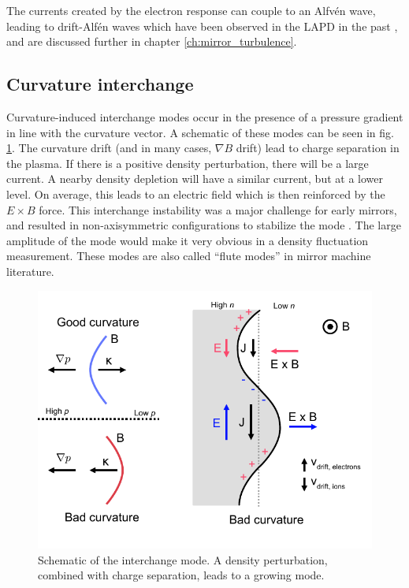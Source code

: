 The currents created by the electron response can couple to an Alfv\'en wave, leading to drift-Alf\'en waves which have been observed in the LAPD in the past \cite{Maggs_1997, Vincena_2006}, and are discussed further in chapter \ref{ch:mirror_turbulence}.

\subsection{Curvature interchange}

Curvature-induced interchange modes occur in the presence of a pressure gradient in line with the curvature vector. A schematic of these modes can be seen in fig. \ref{fig:interchange}. The curvature drift (and in many cases, $\nabla B$ drift) lead to charge separation in the plasma. If there is a positive density perturbation, there will be a large current. A nearby density depletion will have a similar current, but at a lower level. On average, this leads to an electric field which is then reinforced by the $E \times B$ force. This interchange instability was a major challenge for early mirrors, and resulted in non-axisymmetric configurations to stabilize the mode \cite{Post_1987}. The large amplitude of the mode would make it very obvious in a density fluctuation measurement. These modes are also called ``flute modes'' in mirror machine literature.

\begin{figure}
	\centering
	\includegraphics[width=400pt]{figures/interchange.pdf}
	\caption[Schematic of an interchange mode]{\label{fig:interchange}Schematic of the interchange mode. A density perturbation, combined with charge separation, leads to a growing mode.}
\end{figure}

